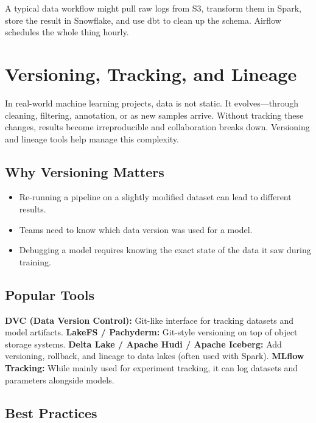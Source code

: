 \documentclass[12pt,openany]{book}
\begin{document}
\begin{examplebox}
A typical data workflow might pull raw logs from S3, transform them in Spark, store the result in Snowflake, and use dbt to clean up the schema. Airflow schedules the whole thing hourly.
\end{examplebox}



\section{Versioning, Tracking, and Lineage}

In real-world machine learning projects, data is not static. It evolves—through cleaning, filtering, annotation, or as new samples arrive. Without tracking these changes, results become irreproducible and collaboration breaks down. Versioning and lineage tools help manage this complexity.

\subsection*{Why Versioning Matters}

\begin{itemize}
    \item Re-running a pipeline on a slightly modified dataset can lead to different results.
    \item Teams need to know which data version was used for a model.
    \item Debugging a model requires knowing the exact state of the data it saw during training.
\end{itemize}

\subsection*{Popular Tools}

\textbf{DVC (Data Version Control):} Git-like interface for tracking datasets and model artifacts.\newline
\textbf{LakeFS / Pachyderm:} Git-style versioning on top of object storage systems.\newline
\textbf{Delta Lake / Apache Hudi / Apache Iceberg:} Add versioning, rollback, and lineage to data lakes (often used with Spark).\newline
\textbf{MLflow Tracking:} While mainly used for experiment tracking, it can log datasets and parameters alongside models.

\subsection*{Best Practices}
\end{document}
